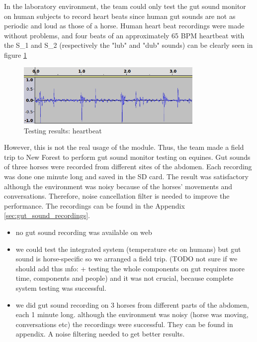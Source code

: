In the laboratory environment, the team could only test the gut sound monitor on human subjects to record heart beats since human gut sounds are not as periodic and loud as those of a horse. Human heart beat recordings were made without problems, and four beats of an approximately 65 BPM heartbeat with the S\_1 and S\_2 (respectively the "lub" and "dub" sounds) can be clearly seen in figure \ref{fig:heartbeat}

\begin{figure}
\centering
\includegraphics[width=0.8\textwidth]{Images/heartbeat.png}
\caption{Testing results: heartbeat}
\label{fig:heartbeat}
\end{figure}

However, this is not the real usage of the module. Thus, the team made a field trip to New Forest to perform gut sound monitor testing on equines. Gut sounds of three horses were recorded from different sites of the abdomen. Each recording was done one minute long and saved in the SD card. The result was satisfactory although the environment was noisy because of the horses' movements and conversations. Therefore, noise cancellation filter is needed to improve the performance. The recordings can be found in the Appendix \ref{sec:gut_sound_recordings}.

\begin{itemize}
\item no gut sound recording was available on web
\item we could test the integrated system (temperature etc on humans) but gut sound is horse-specific so we arranged a field trip. (TODO{} not sure if we should add thıs ınfo: + testing the whole components on gut requires more time, components and people) and it was not crucial, because complete system testing was successful.
\item we did gut sound recording on 3 horses from different parts of the abdomen, each 1 minute long. although the environment was noisy (horse was moving, conversations etc) the recordings were successful. They can be found in appendix. A noise filtering needed to get better results.
\end{itemize}


